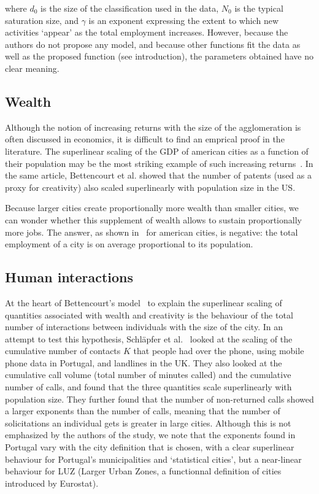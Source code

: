 where $d_0$ is the size of the classification used in the data, $N_0$ is the
typical saturation size, and $\gamma$ is an exponent expressing the extent to
which new activities `appear' as the total employment increases. However,
because the authors do not propose any model, and because other functions fit
the data as well as the proposed function (see introduction), the parameters
obtained have no clear meaning.

\subsection{Wealth}
\label{sub:wealth}

Although the notion of increasing returns with the size of the agglomeration is
often discussed in economics, it is difficult to find an emprical proof in the
literature. The superlinear scaling of the GDP of american cities as a function of
their population may be the most striking example of such increasing
returns~\cite{Bettencourt:2007}. In the same article, Bettencourt et al. showed
that the number of patents (used as a proxy for creativity) also scaled
superlinearly with population size in the US.

Because larger cities create proportionally more wealth than smaller cities, we
can wonder whether this supplement of wealth allows to sustain proportionally
more jobs. The answer, as shown in~\cite{Bettencourt:2014} for american cities,
is negative: the total employment of a city is on average proportional to its population.

\subsection{Human interactions}
\label{sub:human_interactions}

At the heart of Bettencourt's model~\cite{Bettencourt:2013} to explain the
superlinear scaling of quantities associated with wealth and creativity is the
behaviour of the total number of interactions between individuals with the size
of the city. In an attempt to test this hypothesis, Schl\"apfer et
al.~\cite{Schlapfer:2014} looked at the scaling of the cumulative number of
contacts $K$ that people had over the phone, using mobile phone data in
Portugal, and landlines in the UK. They also looked at the cumulative call
volume (total number of minutes called) and the cumulative number of calls, and
found that the three quantities scale superlinearly with population size. They
further found that the number of non-returned calls showed a larger exponents
than the number of calls, meaning that the number of solicitations an individual
gets is greater in large cities.
Although this is not emphasized by the authors of the study, we note that the
exponents found in Portugal vary with the city definition that is chosen, with a
clear superlinear behaviour for Portugal's municipalities and `statistical
cities', but a near-linear behaviour for LUZ (Larger Urban Zones, a functionnal
definition of cities introduced by Eurostat).


